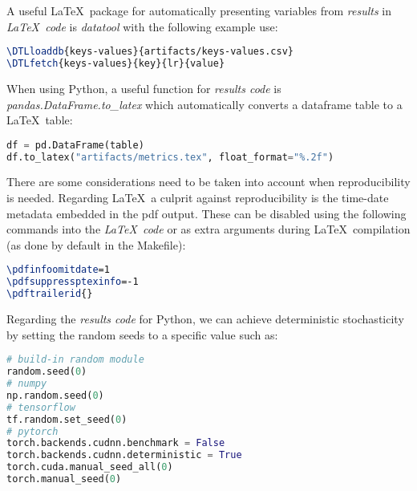 \documentclass[journal]{IEEEtran}
\begin{document}
A useful \LaTeX\ package for automatically presenting variables from \textit{results} in \textit{\LaTeX\ code} is \textit{datatool} with the following example use:
\begin{lstlisting}[language=TeX, style=lststyle, caption={\LaTeX\ datatool example of loading a file that contains pairs of keys and values (artifacts/keys-values.csv) generated by a \textit{results code} and getting the value of a key named lr.}]
\DTLloaddb{keys-values}{artifacts/keys-values.csv}
\DTLfetch{keys-values}{key}{lr}{value}
\end{lstlisting}

When using Python, a useful function for \textit{results code} is \textit{pandas.DataFrame.to\_latex} which automatically converts a dataframe table to a \LaTeX\ table:
\begin{lstlisting}[language=python, style=lststyle, caption={Convert Pandas DataFrame (df) to \LaTeX\ table (artifacts/metrics.tex) in \textit{results code}.}]
df = pd.DataFrame(table)
df.to_latex("artifacts/metrics.tex", float_format="%.2f")
\end{lstlisting}

There are some considerations need to be taken into account when reproducibility is needed.
Regarding \LaTeX\, a culprit against reproducibility is the time-date metadata embedded in the pdf output.
These can be disabled using the following commands into the \textit{\LaTeX\ code} or as extra arguments during \LaTeX\ compilation (as done by default in the Makefile):
\begin{lstlisting}[language=TeX, style=lststyle, caption={\LaTeX\ pdf reproducibility commands.}]
\pdfinfoomitdate=1
\pdfsuppressptexinfo=-1
\pdftrailerid{}
\end{lstlisting}

Regarding the \textit{results code} for Python, we can achieve deterministic stochasticity by setting the random seeds to a specific value such as:
\begin{lstlisting}[language=python, style=lststyle, caption={Python reproducibility commands for popular libraries.}]
# build-in random module
random.seed(0)
# numpy
np.random.seed(0)
# tensorflow
tf.random.set_seed(0)
# pytorch
torch.backends.cudnn.benchmark = False
torch.backends.cudnn.deterministic = True
torch.cuda.manual_seed_all(0)
torch.manual_seed(0)
\end{lstlisting}
\end{document}
